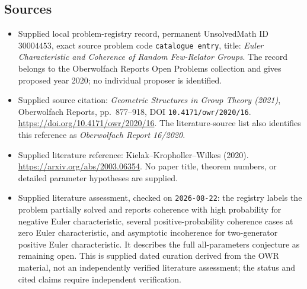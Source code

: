 \documentclass[11pt]{article}
\begin{document}
\subsection{Sources}
\begin{itemize}
\item Supplied local problem-registry record, permanent UnsolvedMath ID \(30004453\), exact source problem code \texttt{catalogue entry}, title: \emph{Euler Characteristic and Coherence of Random Few-Relator Groups}. The record belongs to the Oberwolfach Reports Open Problems collection and gives proposed year 2020; no individual proposer is identified.
\item Supplied source citation: \emph{Geometric Structures in Group Theory (2021)}, Oberwolfach Reports, pp.\ 877--918, DOI \texttt{10.4171/owr/2020/16}. \url{https://doi.org/10.4171/owr/2020/16}. The literature-source list also identifies this reference as \emph{Oberwolfach Report 16/2020}.
\item Supplied literature reference: Kielak--Kropholler--Wilkes (2020). \url{https://arxiv.org/abs/2003.06354}. No paper title, theorem numbers, or detailed parameter hypotheses are supplied.
\item Supplied literature assessment, checked on \texttt{2026-08-22}: the registry labels the problem partially solved and reports coherence with high probability for negative Euler characteristic, several positive-probability coherence cases at zero Euler characteristic, and asymptotic incoherence for two-generator positive Euler characteristic. It describes the full all-parameters conjecture as remaining open. This is supplied dated curation derived from the OWR material, not an independently verified literature assessment; the status and cited claims require independent verification.
\end{itemize}
\end{document}

